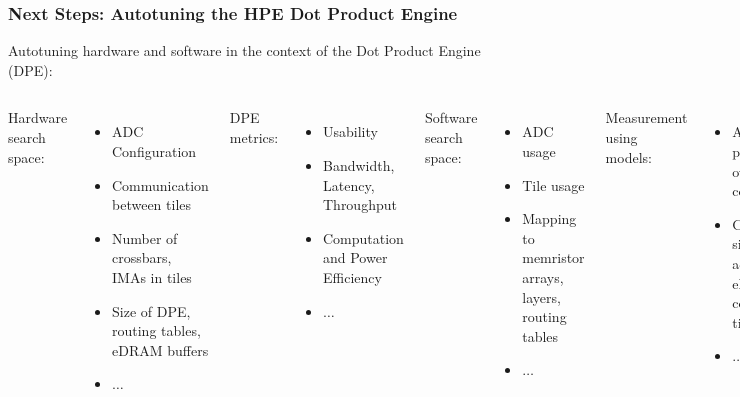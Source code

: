 \documentclass[10pt, compress, aspectratio=169, xcolor=table]{beamer}
\begin{document}
\begin{frame}
    \frametitle{Next Steps: Autotuning the HPE Dot Product Engine}
    Autotuning \alert{hardware and software} in the context of the Dot Product
    Engine (\alert{DPE}):

    \begin{columns}[T,onlytextwidth]
        \alert{Hardware search space}:
        \begin{itemize}
            \item ADC Configuration
            \item Communication between tiles
            \item Number of crossbars, IMAs in tiles
            \item Size of DPE, routing tables, eDRAM buffers
            \item $\dots$
        \end{itemize}

        \alert{DPE metrics}:
        \begin{itemize}
            \item Usability
            \item Bandwidth, Latency, Throughput
            \item Computation and Power Efficiency
            \item $\dots$
        \end{itemize}

        \alert{Software search space}:
        \begin{itemize}
            \item ADC usage
            \item Tile usage
            \item Mapping to memristor arrays, layers, routing tables
            \item $\dots$
        \end{itemize}

        \alert{Measurement using models}:
        \begin{itemize}
            \item Area and power overhead for components
            \item Cycle accurate simulations for accessing eDRAM, communicating tiles
            \item $\dots$
        \end{itemize}
    \end{columns}

    \vfill
\end{frame}
\end{document}
